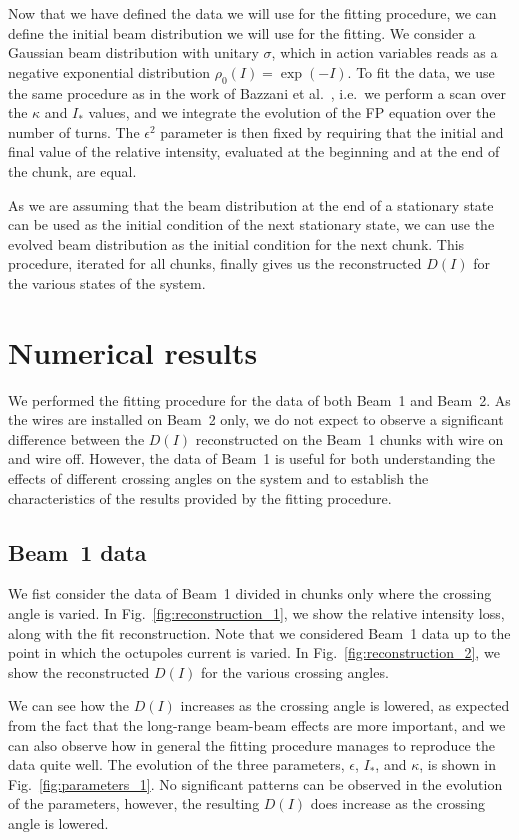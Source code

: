 Now that we have defined the data we will use for the fitting procedure, we can define the initial beam distribution we will use for the fitting. We consider a Gaussian beam distribution with unitary $\sigma$, which in action variables reads as a negative exponential distribution $\rho_0(I) = \exp(-I)$. To fit the data, we use the same procedure as in the work of Bazzani et al.~\cite{bazzani2020diffusion}, i.e.\ we perform a scan over the $\kappa$ and $I_\ast$ values, and we integrate the evolution of the FP equation over the number of turns. The $\epsilon^2$ parameter is then fixed by requiring that the initial and final value of the relative intensity, evaluated at the beginning and at the end of the chunk, are equal.

As we are assuming that the beam distribution at the end of a stationary state can be used as the initial condition of the next stationary state, we can use the evolved beam distribution as the initial condition for the next chunk. This procedure, iterated for all chunks, finally gives us the reconstructed $D(I)$ for the various states of the system.

\section{Numerical results}

We performed the fitting procedure for the data of both Beam~1 and Beam~2. As the wires are installed on Beam~2 only, we do not expect to observe a significant difference between the $D(I)$ reconstructed on the Beam~1 chunks with wire on and wire off. However, the data of Beam~1 is useful for both understanding the effects of different crossing angles on the system and to establish the characteristics of the results provided by the fitting procedure.

\subsection*{Beam~1 data}

We fist consider the data of Beam~1 divided in chunks only where the crossing angle is varied. In Fig.~\ref{fig:reconstruction_1}, we show the relative intensity loss, along with the fit reconstruction. Note that we considered Beam~1 data up to the point in which the octupoles current is varied. In Fig.~\ref{fig:reconstruction_2}, we show the reconstructed $D(I)$ for the various crossing angles.

We can see how the $D(I)$ increases as the crossing angle is lowered, as expected from the fact that the long-range beam-beam effects are more important, and we can also observe how in general the fitting procedure manages to reproduce the data quite well. The evolution of the three parameters, $\epsilon$, $I_\ast$, and $\kappa$, is shown in Fig.~\ref{fig:parameters_1}. No significant patterns can be observed in the evolution of the parameters, however, the resulting $D(I)$ does increase as the crossing angle is lowered.


